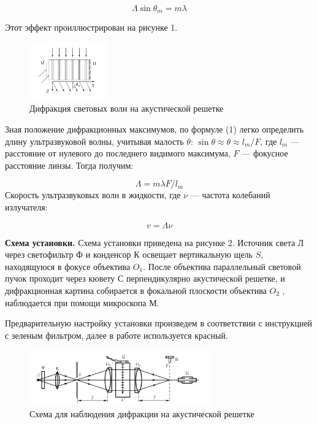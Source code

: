 \documentclass[a4paper,12pt]{article}
\begin{document}
\begin{equation}\label{}	
	\Lambda \sin \theta_m = m \lambda
\end{equation}

	Этот эффект проиллюстрирован на рисунке 1.
	\begin{figure}[h!]
		\centering	
		\includegraphics[width=0.3\textwidth]{wave.png}
		\caption{Дифракция световых волн на акустической решетке}
		\label{diff}
	\end{figure}
    Зная положение дифракционных максимумов, по формуле (1) легко определить длину ультразвуковой волны, учитывая малость $ \theta $: $ \sin \theta \approx \theta \approx l_m /F  $, где $ l_m $ --- расстояние от нулевого до последнего видимого максимума, $ F $ --- фокусное расстояние линзы. Тогда получим:
    	
    	\begin{equation}\label{}
    	 \Lambda = m \lambda F/ l_m 
    	\end{equation}
    	Скорость ультразвуковых волн в жидкости, где $ \nu $ --- частота колебаний излучателя:
    	
    \begin{equation}\label{}
    	v = \Lambda \nu 
    \end{equation}
    
    \textbf{Схема установки. }Схема установки приведена на рисунке 2. Источник света Л через светофильтр Ф и конденсор К освещает вертикальную щель $ S $, находящуюся в фокусе объектива $ O_1 $. После объектива параллельный световой пучок проходит через кювету С перпендикулярно акустической решетке, и дифракционная картина собирается в фокальной плоскости объектива $ O_2 $ , наблюдается при помощи микроскопа М.

    Предварительную настройку установки произведем в соответствии с инструкцией с зеленым фильтром, далее в работе используется красный.
    
    	\begin{figure}[h!]
    	\centering	
    	\includegraphics[width=0.7\textwidth]{stand.png}
    	\caption{Схема для наблюдения дифракции на акустической решетке}
    	\label{shema1}
    \end{figure}
    
\end{document}
